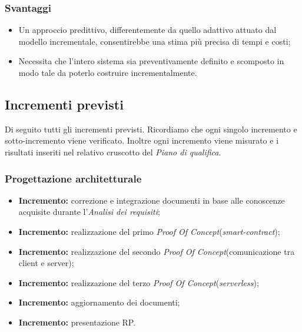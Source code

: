 \subsubsection{Svantaggi}
\begin{itemize}
	\item Un approccio predittivo, differentemente da quello adattivo attuato dal modello incrementale, consentirebbe una stima più precisa di tempi e costi;
	\item Necessita che l'intero sistema sia preventivamente definito e scomposto in modo tale da poterlo costruire incrementalmente.
\end{itemize}
\subsection{Incrementi previsti}
Di seguito tutti gli incrementi previsti. Ricordiamo che ogni singolo incremento e sotto-incremento viene verificato. Inoltre ogni incremento viene misurato e i risultati inseriti nel relativo cruscotto del \textit{Piano di qualifica}\docs.
\subsubsection{Progettazione architetturale}
\begin{itemize}
  \item \textbf{ Incremento:} correzione e integrazione documenti in base alle conoscenze acquisite durante l'\textit{Analisi dei requisiti}\docs;
  \item \textbf{ Incremento:} realizzazione del primo \textit{Proof Of Concept}\glo (\textit{smart-contract}\glos);
  \item \textbf{ Incremento:} realizzazione del secondo \textit{Proof Of Concept}\glo (comunicazione tra client e server);
  \item \textbf{ Incremento:} realizzazione del terzo \textit{Proof Of Concept}\glo (\textit{serverless}\glos);
  \item \textbf{ Incremento:} aggiornamento dei documenti;
  \item \textbf{ Incremento:} presentazione RP.
\end{itemize}
